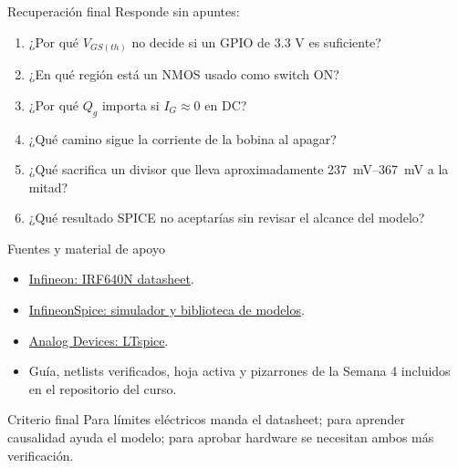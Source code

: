 \documentclass[aspectratio=169]{beamer}
\begin{document}
\begin{frame}{Recuperación final}
  Responde sin apuntes:
  \begin{enumerate}
    \item ¿Por qué $V_{GS(th)}$ no decide si un GPIO de 3.3 V es suficiente?
    \item ¿En qué región está un NMOS usado como switch ON?
    \item ¿Por qué $Q_g$ importa si $I_G\approx0$ en DC?
    \item ¿Qué camino sigue la corriente de la bobina al apagar?
    \item ¿Qué sacrifica un divisor que lleva aproximadamente
      \SI{237}{\milli\volt}--\SI{367}{\milli\volt} a la mitad?
    \item ¿Qué resultado SPICE no aceptarías sin revisar el alcance del modelo?
  \end{enumerate}
\end{frame}

\begin{frame}{Fuentes y material de apoyo}
  \begin{itemize}
    \item \href{https://www.infineon.com/assets/row/public/documents/24/49/infineon-irf640n-datasheet-en.pdf}{Infineon: IRF640N datasheet}.
    \item \href{https://www.infineon.com/design-resources/simulation-modeling/infineonspice-offline-simulation-tool}{InfineonSpice: simulador y biblioteca de modelos}.
    \item \href{https://www.analog.com/en/resources/design-tools-and-calculators/ltspice-simulator.html}{Analog Devices: LTspice}.
    \item Guía, netlists verificados, hoja activa y pizarrones de la Semana 4
      incluidos en el repositorio del curso.
  \end{itemize}
  \begin{alertblock}{Criterio final}
    Para límites eléctricos manda el datasheet; para aprender causalidad ayuda
    el modelo; para aprobar hardware se necesitan ambos más verificación.
  \end{alertblock}
\end{frame}
\end{document}
